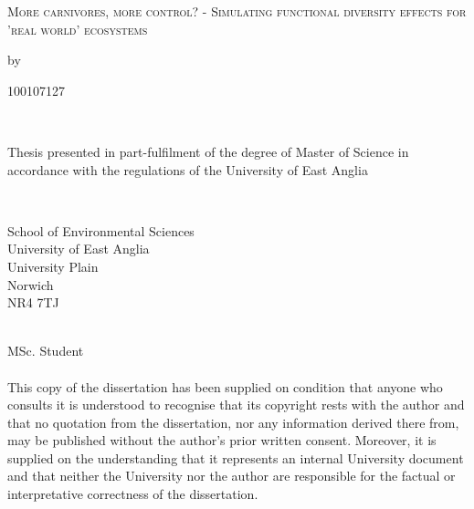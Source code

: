 \begin{titlepage}
\vspace{5cm}

\begin{center}
\begin{Large}
\textsc{More carnivores, more control? - Simulating functional diversity effects for 'real world' ecosystems}\\
\end{Large}
\vspace{1.5cm}
by
\\
\vspace{1.5cm}
\begin{large}
100107127
\end{large}
\\
\vspace{2cm}
\begin{large}
Thesis presented in part-fulfilment of the degree of Master of Science in accordance with the
regulations of the University of East Anglia
\end{large}
\\
\end{center}
\vspace{6.5cm}
\begin{small}
School of Environmental Sciences\\
University of East Anglia\\
University Plain\\
Norwich\\
NR4 7TJ\\
\end{small}
\\
\small
{} MSc. Student\\\\
This copy of the dissertation has been supplied on condition that anyone who consults it is understood to recognise that 
its copyright rests with the author and that no quotation from the dissertation, nor any information derived there from, may 
be published without the author’s prior written consent. Moreover, it is supplied on the understanding that it represents an 
internal University document and that neither the University nor the author are responsible for the factual or interpretative 
correctness of the dissertation.
\end{titlepage}